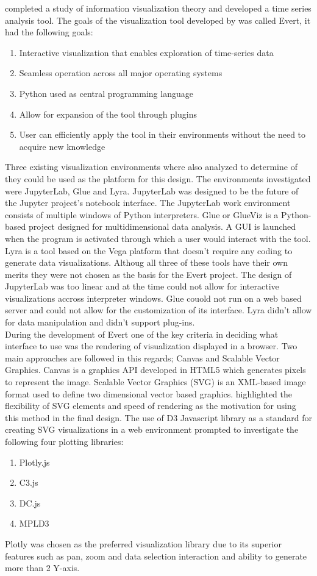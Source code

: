 \cite{Herbst2017} completed a study of information visualization theory and developed a time series analysis tool. The goals of the visualization tool developed by \cite{Herbst2017} was called Evert, it had the following goals:
\begin{enumerate}
	\item Interactive visualization that enables exploration of time-series data
	\item Seamless operation across all major operating systems
	\item Python used as central programming language
	\item Allow for expansion of the tool through plugins
	\item User can efficiently apply the tool in their environments without the need to acquire new knowledge
\end{enumerate}
Three existing visualization environments where also analyzed to determine of they could be used as the platform for this design. The environments investigated were JupyterLab, Glue and Lyra. JupyterLab was designed to be the future of the Jupyter project's notebook interface. The JupyterLab work environment consists of multiple windows of Python interpreters. Glue or GlueViz is a Python-based project designed for multidimensional data analysis. A GUI is launched when the program is activated through which a user would interact with the tool. Lyra is a tool based on the Vega platform that doesn't require any coding to generate data visualizations. Althoug all three of these tools have their own merits they were not chosen as the basis for the Evert project. The design of JupyterLab was too linear and at the time could not allow for interactive visualizations accross interpreter windows. Glue couold not run on a web based server and could not allow for the customization of its interface. Lyra didn't allow for data manipulation and didn't support plug-ins.\\

During the development of Evert one of the key criteria in deciding what interface to use was the rendering of visualization displayed in a browser. Two main approaches are followed in this regards; Canvas and Scalable Vector Graphics. Canvas is a graphics API developed in HTML5 which generates pixels to represent the image. Scalable Vector Graphics (SVG) is an XML-based image format used to define two dimensional vector based graphics. \cite{Herbst2017} highlighted the flexibility of SVG elements and speed of rendering as the motivation for using this method in the final design. The use of D3 Javascript library as a standard for creating SVG visualizations in a web environment prompted  \cite{Herbst2017} to investigate the following four plotting libraries:
\begin{enumerate}
	\item Plotly.js
	\item C3.js
	\item DC.js
	\item MPLD3
\end{enumerate}
Plotly was chosen as the preferred visualization library due to its superior features such as pan, zoom and data selection interaction and ability to generate more than 2 Y-axis.


